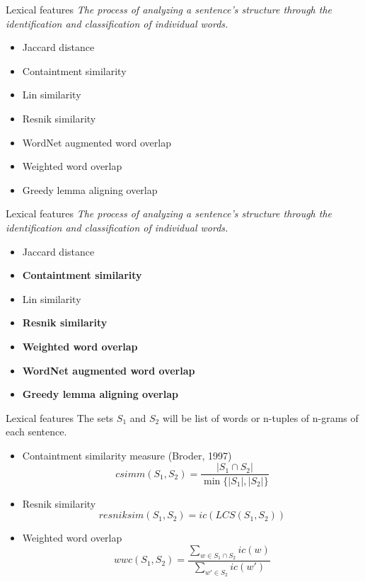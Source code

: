 \begin{frame}{Lexical features}
\textit{The process of analyzing a sentence's structure through the identification and classification of individual words.}
\vspace{0.5cm}
\begin{itemize}
    \item Jaccard distance 
    \item Containtment similarity 
    \item Lin similarity 
    \item Resnik similarity 
    \item WordNet augmented word overlap 
    \item Weighted word overlap 
    \item Greedy lemma aligning overlap
\end{itemize}
\end{frame}

\begin{frame}{Lexical features}
    \textit{The process of analyzing a sentence's structure through the identification and classification of individual words.}
    \vspace{0.5cm}
    \begin{itemize}
        \item Jaccard distance 
        \item \textbf{Containtment similarity}
        \item Lin similarity 
        \item \textbf{Resnik similarity }
        \item \textbf{Weighted word overlap}
        \item \textbf{WordNet augmented word overlap}
        \item \textbf{Greedy lemma aligning overlap}
    \end{itemize}
\end{frame}

    \begin{frame}{Lexical features}
        The sets $S_1$ and $S_2$ will be list of words or n-tuples of n-grams of each sentence. \\
        \begin{itemize}
            \item Containtment similarity measure (Broder, 1997)
            \[
            csimm(S_1,S_2) = \frac{\left| S_1 \cap S_2 \right|}{\min \{ \left| S_1 \right|, \left| S_2 \right| \}}
            \]
            \item Resnik similarity 
            \[resniksim(S_1,S_2) = ic(LCS(S_1,S_2)) \]
            \item Weighted word overlap 
            \[
            wwc(S_1, S_2) = 
            \frac{\sum_{w \in S_1 \cap S_2} ic(w)}{\sum_{w' \in S_2} ic(w')}
            \]
        \end{itemize}
\end{frame}

